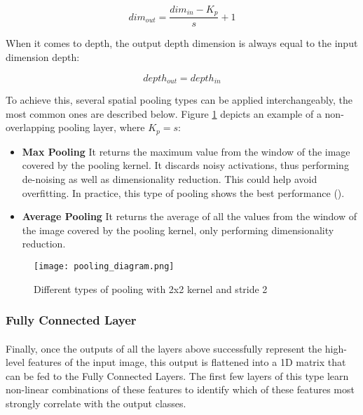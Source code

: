 \begin{equation}
    \label{pool_dim_eq}
    dim_{out} = \frac{dim_{in} - K_p}{s} + 1
\end{equation}

When it comes to depth, the output depth dimension is always equal to the input dimension depth:

\begin{equation}
    \label{pool_depth_eq}
    depth_{out} = depth_{in}
\end{equation}

To achieve this, several spatial pooling types can be applied interchangeably, the most common ones are described below. Figure \ref{fig_pooling} depicts an example of a non-overlapping pooling layer, where $K_p = s$:

\begin{itemize}
    \item \textbf{Max Pooling} It returns the maximum value from the window of the image covered by the pooling kernel. It discards noisy activations, thus performing de-noising as well as dimensionality reduction. This could help avoid overfitting. In practice, this type of pooling shows the best performance (\cite{GoodBengCour16}).
    \item \textbf{Average Pooling} It returns the average of all the values from the window of the image covered by the pooling kernel, only performing dimensionality reduction.
\end{itemize}

    \begin{figure}[hbt!]
        \centering
        \texttt{[image: pooling\_diagram.png]}
        \caption{Different types of pooling with 2x2 kernel and stride 2}
        \label{fig_pooling}
    \end{figure}
    

\subsubsection{Fully Connected Layer}
\paragraph{}
Finally, once the outputs of all the layers above successfully represent the high-level features of the input image, this output is flattened into a 1D matrix that can be fed to the Fully Connected Layers. The first few layers of this type learn non-linear combinations of these features to identify which of these features most strongly correlate with the output classes.


